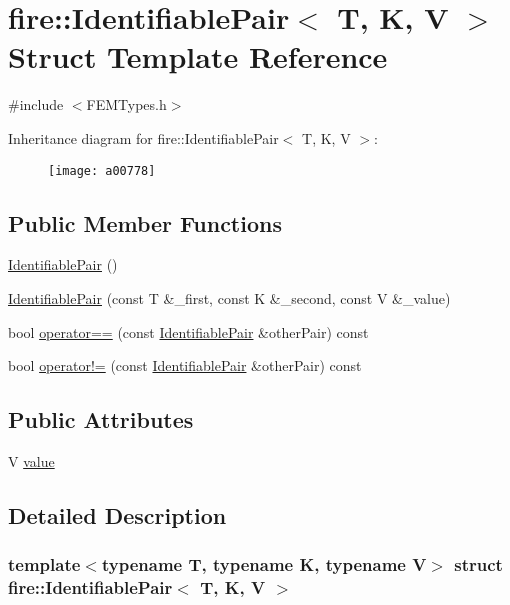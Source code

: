 \hypertarget{a00778}{}\section{fire\+:\+:Identifiable\+Pair$<$ T, K, V $>$ Struct Template Reference}
\label{a00778}


{\ttfamily \#include $<$F\+E\+M\+Types.\+h$>$}

Inheritance diagram for fire\+:\+:Identifiable\+Pair$<$ T, K, V $>$\+:\begin{figure}[H]
\begin{center}
\leavevmode
\texttt{[image: a00778]}
\end{center}
\end{figure}
\subsection*{Public Member Functions}
\begin{DoxyCompactItemize}
\item 
\hyperlink{a00778_a00a1d2e1fc20b2edf8e27dc3158d8826}{Identifiable\+Pair} ()
\item 
\hyperlink{a00778_ade6ddca350a2128a5cab071118c26fee}{Identifiable\+Pair} (const T \&\+\_\+first, const K \&\+\_\+second, const V \&\+\_\+value)
\item 
bool \hyperlink{a00778_a668b15329da55ba90a0232077f7c069c}{operator==} (const \hyperlink{a00778}{Identifiable\+Pair} \&other\+Pair) const
\item 
bool \hyperlink{a00778_ac6a86b2992ee7fa5f868077a73d2667f}{operator!=} (const \hyperlink{a00778}{Identifiable\+Pair} \&other\+Pair) const
\end{DoxyCompactItemize}
\subsection*{Public Attributes}
\begin{DoxyCompactItemize}
\item 
V \hyperlink{a00778_a4aa238990585cb35d1902140ebe6fb9f}{value}
\end{DoxyCompactItemize}


\subsection{Detailed Description}
\subsubsection*{template$<$typename T, typename K, typename V$>$\newline
struct fire\+::\+Identifiable\+Pair$<$ T, K, V $>$}


